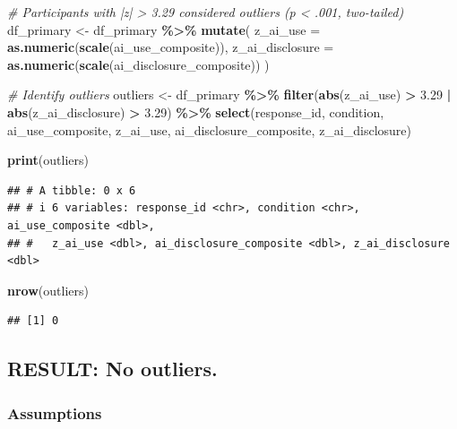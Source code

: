 \documentclass[
]{article}
\newenvironment{Shaded}{\begin{snugshade}}{\end{snugshade}}
\newcommand{\AttributeTok}[1]{\textcolor[rgb]{0.13,0.29,0.53}{#1}}
\newcommand{\CommentTok}[1]{\textcolor[rgb]{0.56,0.35,0.01}{\textit{#1}}}
\newcommand{\FloatTok}[1]{\textcolor[rgb]{0.00,0.00,0.81}{#1}}
\newcommand{\FunctionTok}[1]{\textcolor[rgb]{0.13,0.29,0.53}{\textbf{#1}}}
\newcommand{\NormalTok}[1]{#1}
\newcommand{\OtherTok}[1]{\textcolor[rgb]{0.56,0.35,0.01}{#1}}
\newcommand{\SpecialCharTok}[1]{\textcolor[rgb]{0.81,0.36,0.00}{\textbf{#1}}}
\begin{document}
\begin{Shaded}
\begin{Highlighting}[]
\CommentTok{\# Participants with |z| \textgreater{} 3.29 considered outliers (p \textless{} .001, two{-}tailed)}
\NormalTok{df\_primary }\OtherTok{\textless{}{-}}\NormalTok{ df\_primary }\SpecialCharTok{\%\textgreater{}\%}
  \FunctionTok{mutate}\NormalTok{(}
    \AttributeTok{z\_ai\_use =} \FunctionTok{as.numeric}\NormalTok{(}\FunctionTok{scale}\NormalTok{(ai\_use\_composite)),}
    \AttributeTok{z\_ai\_disclosure =} \FunctionTok{as.numeric}\NormalTok{(}\FunctionTok{scale}\NormalTok{(ai\_disclosure\_composite))}
\NormalTok{  )}

\CommentTok{\# Identify outliers}
\NormalTok{outliers }\OtherTok{\textless{}{-}}\NormalTok{ df\_primary }\SpecialCharTok{\%\textgreater{}\%}
  \FunctionTok{filter}\NormalTok{(}\FunctionTok{abs}\NormalTok{(z\_ai\_use) }\SpecialCharTok{\textgreater{}} \FloatTok{3.29} \SpecialCharTok{|} \FunctionTok{abs}\NormalTok{(z\_ai\_disclosure) }\SpecialCharTok{\textgreater{}} \FloatTok{3.29}\NormalTok{) }\SpecialCharTok{\%\textgreater{}\%}
  \FunctionTok{select}\NormalTok{(response\_id, condition, ai\_use\_composite, z\_ai\_use,}
\NormalTok{         ai\_disclosure\_composite, z\_ai\_disclosure)}

\FunctionTok{print}\NormalTok{(outliers)}
\end{Highlighting}
\end{Shaded}

\begin{verbatim}
## # A tibble: 0 x 6
## # i 6 variables: response_id <chr>, condition <chr>, ai_use_composite <dbl>,
## #   z_ai_use <dbl>, ai_disclosure_composite <dbl>, z_ai_disclosure <dbl>
\end{verbatim}

\begin{Shaded}
\begin{Highlighting}[]
\FunctionTok{nrow}\NormalTok{(outliers)}
\end{Highlighting}
\end{Shaded}

\begin{verbatim}
## [1] 0
\end{verbatim}

\subsection{RESULT: No outliers.}\label{result-no-outliers.}

\subsubsection{Assumptions}\label{assumptions}
\end{document}
